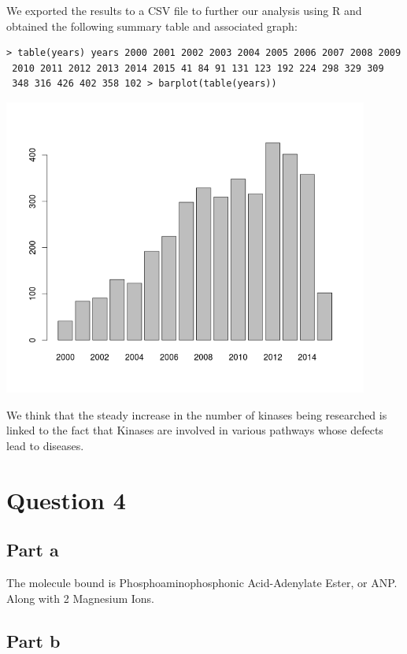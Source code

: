 \documentclass[11pt, a4paper,titlepage]{article}
\begin{document}
We exported the results to a CSV file to further our analysis using
R and obtained the following summary table and associated graph:

\begin{verbatim}
> table(years) years 2000 2001 2002 2003 2004 2005 2006 2007 2008 2009
 2010 2011 2012 2013 2014 2015 41 84 91 131 123 192 224 298 329 309
 348 316 426 402 358 102 > barplot(table(years))
\end{verbatim}

\includegraphics[width=12cm]{./Figures/pdb_kinases_growth.png}

We think that the steady increase in the number of kinases being
researched is linked to the fact that Kinases are involved in various
pathways whose defects lead to diseases. 

\section*{Question 4}
\subsection*{Part a}

The molecule bound is Phosphoaminophosphonic Acid-Adenylate Ester, or
ANP. Along with 2 Magnesium Ions.

\subsection*{Part b}
\end{document}
